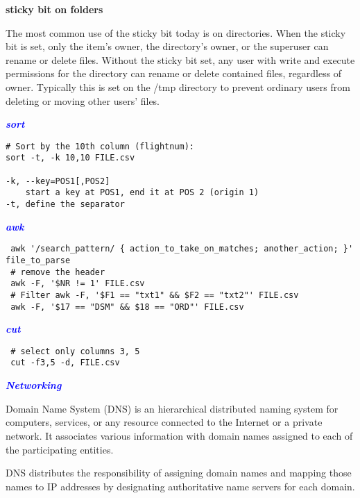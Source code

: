 \documentclass[9pt]{amsart}
\newcommand{\filldots}{\noindent \textbf {\textcolor {blue} {\dotfill}} }
\begin{document}
\begin{multicols}{2}
\noindent \textbf  {sticky bit on folders} 

\noindent The most common use of the sticky bit today is on directories. When the sticky bit is set, only the item's owner, the directory's owner, or the superuser can rename or delete files. Without the sticky bit set, any user with write and execute permissions for the directory can rename or delete contained files, regardless of owner. Typically this is set on the /tmp directory to prevent ordinary users from deleting or moving other users' files.

\filldots
 
\noindent \textbf {\textcolor {blue} {\em sort}}

\begin{lstlisting}
# Sort by the 10th column (flightnum):
sort -t, -k 10,10 FILE.csv

-k, --key=POS1[,POS2]
    start a key at POS1, end it at POS 2 (origin 1) 
-t, define the separator
\end{lstlisting}

\filldots

\noindent \textbf {\textcolor {blue} {\em awk}}
 
\begin{lstlisting}
 awk '/search_pattern/ { action_to_take_on_matches; another_action; }' file_to_parse
 # remove the header
 awk -F, '$NR != 1' FILE.csv
 # Filter awk -F, '$F1 == "txt1" && $F2 == "txt2"' FILE.csv
 awk -F, '$17 == "DSM" && $18 == "ORD"' FILE.csv
\end{lstlisting}
 
\filldots

\noindent \textbf {\textcolor {blue} {\em cut}}
 
\begin{lstlisting}
 # select only columns 3, 5
 cut -f3,5 -d, FILE.csv
\end{lstlisting}
 
\filldots
 
\noindent \textbf {\textcolor {blue} {\em Networking}}

\noindent {\textcolor {blue} {\em DNS}} 

\noindent Domain Name System (DNS) is an hierarchical distributed naming system for computers, services, or any resource connected to the Internet or a private network. It associates various information with domain names assigned to each of the participating entities.

\noindent DNS distributes the responsibility of assigning domain names and mapping those names to IP addresses by designating authoritative name servers for each domain.


\end{multicols}
\end{document}
